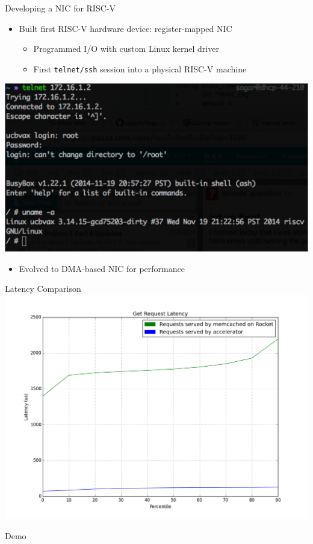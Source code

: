 \documentclass{beamer}
\begin{document}
\begin{frame}{Developing a NIC for RISC-V}
    \begin{itemize}
\item Built first RISC-V hardware device: register-mapped NIC
	\begin{itemize}
	\footnotesize
	\item Programmed I/O with custom Linux kernel driver
	\item First \texttt{telnet/ssh} session into a physical RISC-V machine
	\end{itemize}
\end{itemize}
\begin{center}
        \includegraphics[scale=0.3]{../img/first_telnet.png}
    \end{center}

\begin{itemize}
\item Evolved to DMA-based NIC for performance
\end{itemize}
\end{frame}



\begin{frame}{Latency Comparison}
    \includegraphics[width=\linewidth]{../img/graph.png}
\end{frame}

\begin{frame}
    Demo
\end{frame}
\end{document}
